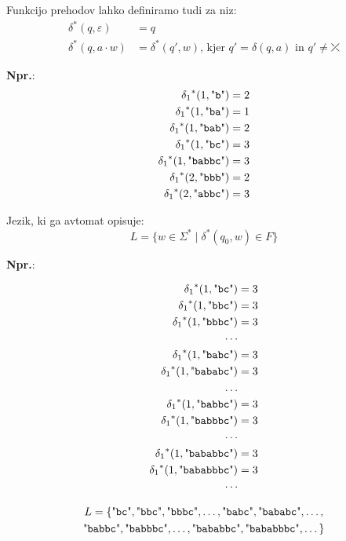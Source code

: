 \documentclass{article}
\newcommand{\Ex}{\textbf{Npr.}:\ }
\newcommand{\Str}[1]{\text{\textquotedbl\texttt{#1}\textquotedbl}}
\newcommand{\Seq}{\cdot}
\newcommand{\Kleene}[1]{{#1}^\ast}
\newcommand{\Err}{\rdiagovfdiag}
\begin{document}
Funkcijo prehodov lahko definiramo tudi za niz:
\begin{align*} %
  \Kleene{\delta}(q, \varepsilon) &= q\\
  \Kleene{\delta}(q, a \Seq w) &= \Kleene{\delta}(q', w) \text{, kjer } q' = \delta(q, a) \text{ in } q' \neq \Err
\end{align*}

\Ex
\begin{align*}
  \Kleene{\delta_1}(1, \Str{b}) &= 2 \\
  \Kleene{\delta_1}(1, \Str{ba}) &= 1 \\
  \Kleene{\delta_1}(1, \Str{bab}) &= 2 \\
  \Kleene{\delta_1}(1, \Str{bc}) &= 3 \\
  \Kleene{\delta_1}(1, \Str{babbc}) &= 3 \\
  \Kleene{\delta_1}(2, \Str{bbb}) &= 2 \\
  \Kleene{\delta_1}(2, \Str{abbc}) &= 3
\end{align*}

Jezik, ki ga avtomat opisuje:
\begin{equation*}
  L = \{w \in \Kleene{\Sigma} \mid \Kleene{\delta}(q_0, w) \in F\}
\end{equation*}

\Ex

\begin{align*}
  \Kleene{\delta_1}(1, \Str{bc}) &= 3 \\
  \Kleene{\delta_1}(1, \Str{bbc}) &= 3 \\
  \Kleene{\delta_1}(1, \Str{bbbc}) &= 3 \\
  \cdots \\
  \Kleene{\delta_1}(1, \Str{babc}) &= 3 \\
  \Kleene{\delta_1}(1, \Str{bababc}) &= 3 \\
  \ldots \\
  \Kleene{\delta_1}(1, \Str{babbc}) &= 3 \\
  \Kleene{\delta_1}(1, \Str{babbbc}) &= 3 \\
  \cdots \\
  \Kleene{\delta_1}(1, \Str{bababbc}) &= 3 \\
  \Kleene{\delta_1}(1, \Str{bababbbc}) &= 3 \\
  \cdots \\
\end{align*}

\begin{multline*}
  L = \{ \Str{bc}, \Str{bbc}, \Str{bbbc}, \ldots, \Str{babc}, \Str{bababc}, \ldots,\\
  \Str{babbc},  \Str{babbbc}, \ldots, \Str{bababbc}, \Str{bababbbc}, \dots \}
\end{multline*}
\end{document}
